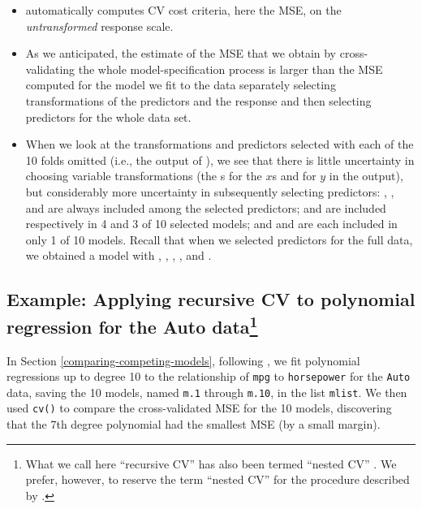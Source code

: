 \documentclass[
]{jss}
\providecommand{\tightlist}{%
  \setlength{\itemsep}{0pt}\setlength{\parskip}{0pt}}
\begin{document}
\begin{itemize}
\tightlist
\item
   automatically computes CV cost criteria,
  here the MSE, on the \emph{untransformed} response scale.
\item
  As we anticipated, the estimate of the MSE that we obtain by
  cross-validating the whole model-specification process is larger than
  the MSE computed for the model we fit to the  data
  separately selecting transformations of the predictors and the
  response and then selecting predictors for the whole data set.
\item
  When we look at the transformations and predictors selected with each
  of the 10 folds omitted (i.e., the output of ),
  we see that there is little uncertainty in choosing variable
  transformations (the s for the \(x\)s and 
  for \(y\) in the output), but considerably more uncertainty in
  subsequently selecting predictors: , ,
  and  are always included among the selected predictors;
   and  are included respectively
  in 4 and 3 of 10 selected models; and  and
   are each included in only 1 of 10 models. Recall that
  when we selected predictors for the full data, we obtained a model
  with , , ,
  , and .
\end{itemize}

\subsection[Example: Applying recursive CV to polynomial regression for
the Auto data]{\texorpdfstring{Example: Applying recursive CV to
polynomial regression for the Auto
data\footnote{What we call here ``recursive CV'' has also been termed
  ``nested CV'' \citep[e.g., in the  package
  by][]{OlsenZachariae:2024}. We prefer, however, to reserve the term
  ``nested CV'' for the procedure described by
  \citet{BatesHastieTibshirani:2023}.}}{Example: Applying recursive CV to polynomial regression for the Auto data}}\label{example-applying-recursive-cv-to-polynomial-regression-for-the-auto-datarecursive-cv}

In Section \ref{comparing-competing-models}, following \citet[Secs. 5.1,
5.3]{JamesEtAl:2021}, we fit polynomial regressions up to degree 10 to
the relationship of \texttt{mpg} to \texttt{horsepower} for the
\texttt{Auto} data, saving the 10 models, named \texttt{m.1} through
\texttt{m.10}, in the list \texttt{mlist}. We then used \texttt{cv()} to
compare the cross-validated MSE for the 10 models, discovering that the
7th degree polynomial had the smallest MSE (by a small margin).
\end{document}
